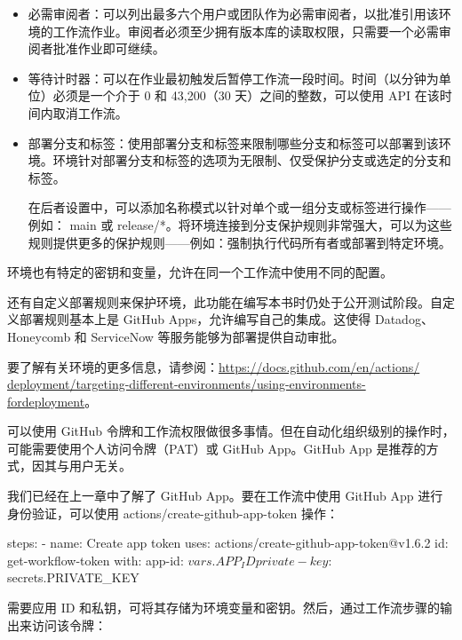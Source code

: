 \begin{itemize}
\item 
必需审阅者：可以列出最多六个用户或团队作为必需审阅者，以批准引用该环境的工作流作业。审阅者必须至少拥有版本库的读取权限，只需要一个必需审阅者批准作业即可继续。

\item 
等待计时器：可以在作业最初触发后暂停工作流一段时间。时间（以分钟为单位）必须是一个介于 0 和 43,200（30 天）之间的整数，可以使用 API 在该时间内取消工作流。

\item 
部署分支和标签：使用部署分支和标签来限制哪些分支和标签可以部署到该环境。环境针对部署分支和标签的选项为无限制、仅受保护分支或选定的分支和标签。

在后者设置中，可以添加名称模式以针对单个或一组分支或标签进行操作——例如： main 或 release/*。将环境连接到分支保护规则非常强大，可以为这些规则提供更多的保护规则——例如：强制执行代码所有者或部署到特定环境。
\end{itemize}

环境也有特定的密钥和变量，允许在同一个工作流中使用不同的配置。

还有自定义部署规则来保护环境，此功能在编写本书时仍处于公开测试阶段。自定义部署规则基本上是 GitHub Apps，允许编写自己的集成。这使得 Datadog、Honeycomb 和 ServiceNow 等服务能够为部署提供自动审批。

要了解有关环境的更多信息，请参阅：\url{https://docs.github.com/en/actions/ deployment/targeting-different-environments/using-environments-fordeployment}。


可以使用 GitHub 令牌和工作流权限做很多事情。但在自动化组织级别的操作时，可能需要使用个人访问令牌（PAT）或 GitHub App。GitHub App 是推荐的方式，因其与用户无关。

我们已经在上一章中了解了 GitHub App。要在工作流中使用 GitHub App 进行身份验证，可以使用 actions/create-github-app-token 操作：

\begin{shell}
steps:
  - name: Create app token
    uses: actions/create-github-app-token@v1.6.2
    id: get-workflow-token
    with:
      app-id: ${{ vars.APP_ID }}
      private-key: ${{ secrets.PRIVATE_KEY }}
\end{shell}

需要应用 ID 和私钥，可将其存储为环境变量和密钥。然后，通过工作流步骤的输出来访问该令牌：


